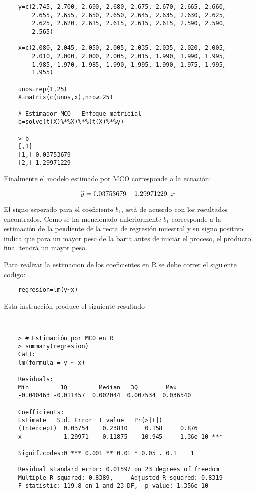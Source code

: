 \documentclass[base=hide,12pt]{elegantbook}
\begin{document}
	\begin{Box3}{} 
	\begin{verbatim} 
	y=c(2.745, 2.700, 2.690, 2.680, 2.675, 2.670, 2.665, 2.660, 
	    2.655, 2.655, 2.650, 2.650, 2.645, 2.635, 2.630, 2.625, 
	    2.625, 2.620, 2.615, 2.615, 2.615, 2.615, 2.590, 2.590, 
	    2.565)
	
	x=c(2.080, 2.045, 2.050, 2.005, 2.035, 2.035, 2.020, 2.005, 
	    2.010, 2.000, 2.000, 2.005, 2.015, 1.990, 1.990, 1.995,  
	    1.985, 1.970, 1.985, 1.990, 1.995, 1.990, 1.975, 1.995,  
	    1.955)
	
	unos=rep(1,25)
	X=matrix(c(unos,x),nrow=25)
	
	# Estimador MCO - Enfoque matricial
	b=solve(t(X)%*%X)%*%(t(X)%*%y)
	
	> b
	[,1]
	[1,] 0.03753679
	[2,] 1.29971229
	\end{verbatim}
	\end{Box3}
	
	
Finalmente el modelo estimado por MCO corresponde a la ecuación:

	$$ \widehat{y}= 0.03753679 + 1.29971229 \hspace{.2cm}x$$
	
	
	El signo esperado para el coeficiente $b_{1}$, está de acuerdo con los resultados encontrados. Como se ha mencionado anteriormente $b_{1}$ corresponde a la estimación de la pendiente de la recta de regresión muestral y su signo positivo indica que para un mayor peso de la barra antes de iniciar el proceso, el producto final tendrá un mayor peso. 
	
	Para realizar la estimacion de los coeficientes en R se debe correr el siguiente codigo:
	
	\begin{Box3}{}
	\begin{verbatim}
	regresion=lm(y~x)
	\end{verbatim}
	\end{Box3}
	Esta instrucción produce el siguiente resultado \\
	
\begin{Box3}{}
	\begin{verbatim}
		
	
	> # Estimación por MCO en R
	> summary(regresion)
	Call:
	lm(formula = y ~ x)

	Residuals:
	Min         1Q         Median   3Q        Max 
	-0.040463 -0.011457  0.002044  0.007534  0.036540

	Coefficients:
	Estimate   Std. Error  t value   Pr(>|t|)    
	(Intercept)  0.03754    0.23810     0.158     0.876    
	x            1.29971    0.11875    10.945     1.36e-10 ***
	---
	Signif.codes:0 *** 0.001 ** 0.01 * 0.05 . 0.1    1 

	Residual standard error: 0.01597 on 23 degrees of freedom
	Multiple R-squared: 0.8389,     Adjusted R-squared: 0.8319 
	F-statistic: 119.8 on 1 and 23 DF,  p-value: 1.356e-10

	\end{verbatim}	
\end{Box3}
	
\end{document}
